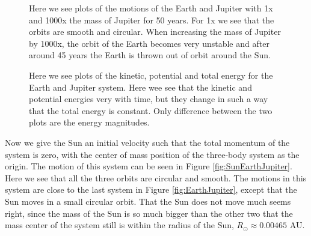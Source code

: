 \documentclass[12pt,a4paper,english]{article}
\begin{document}
\begin{figure}[htbp]
	\hspace{0.5em}
	\caption{Here we see plots of the motions of the Earth and Jupiter with 1x and 1000x the mass of Jupiter for 50 years. For 1x we see that the orbits are smooth and circular. When increasing the mass of Jupiter by 1000x, the orbit of the Earth becomes very unstable and after around 45 years the Earth is thrown out of orbit around the Sun. \label{fig:PosEarthJupiter}}
\end{figure}

\begin{figure}[htbp]
	\hspace{0.5em}
	\caption{Here we see plots of the kinetic, potential and total energy for the Earth and Jupiter system. Here wee see that the kinetic and potential energies very with time, but they change in such a way that the total energy is constant. Only difference between the two plots are the energy magnitudes. \label{fig:EarthJupiterEnergies}}
\end{figure}
\newpage
Now we give the Sun an initial velocity such that the total momentum of the system is zero, with the center of mass position of the three-body system as the origin. The motion of this system can be seen in Figure  \ref{fig:SunEarthJupiter}. Here we see that all the three orbits are circular and smooth. The motions in this system are close to the last system in Figure \ref{fig:EarthJupiter}, except that the Sun moves in a small circular orbit. That the Sun does not move much seems right, since the mass of the Sun is so much bigger than the other two that the mass center of the system still is within the radius of the Sun, $R_{\odot}\approx 0.00465$ AU.
\end{document}
